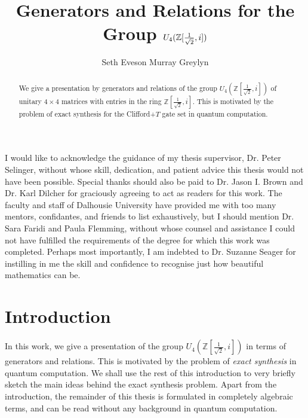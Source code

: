 \documentclass{dalthesis}
\theoremstyle{theorem}
\theoremstyle{definition}
\theoremstyle{definition}  %
\theoremstyle{definition}
\newcommand{\Z}{\mathbb{Z}}
\renewcommand{\:}{\mathbin{:}}
\begin{document}
\title{Generators and Relations for the Group $U_4(\Z[\frac{1}{\sqrt2},\lowercase{i}])$}
\author{Seth Eveson Murray Greylyn}
\frontmatter

\begin{abstract}
We give a presentation by generators and relations of the group $U_4(\Z[\frac{1}{\sqrt2},i])$ of unitary $4\times 4$ matrices with entries in the ring $\Z[\frac{1}{\sqrt2},i]$. This is motivated by the problem of exact synthesis for the Clifford+$T$ gate set in quantum computation.
\end{abstract}

\begin{acknowledgements}
I would like to acknowledge the guidance of my thesis supervisor, Dr. Peter Selinger, without whose skill, dedication, and patient advice this thesis would not have been possible. Special thanks should also be paid to Dr. Jason I. Brown and Dr. Karl Dilcher for graciously agreeing to act as readers for this work. The faculty and staff of Dalhousie University have provided me with too many mentors, confidantes, and friends to list exhaustively, but I should mention Dr. Sara Faridi and Paula Flemming, without whose counsel and assistance I could not have fulfilled the requirements of the degree for which this work was completed. Perhaps most importantly, I am indebted to Dr. Suzanne Seager for instilling in me the skill and confidence to recognise just how beautiful mathematics can be.
\end{acknowledgements}
\mainmatter
\chapter{Introduction}

In this work, we give a presentation of the group $U_4(\Z[\frac{1}{\sqrt{2}},i])$ in terms of generators and relations. This is motivated by the problem of {\em exact synthesis} in quantum computation. We shall use the rest of this introduction to very briefly sketch the main ideas behind the exact synthesis problem. Apart from the introduction, the remainder of this thesis is formulated in completely algebraic terms, and can be read without any background in quantum computation.
\end{document}
